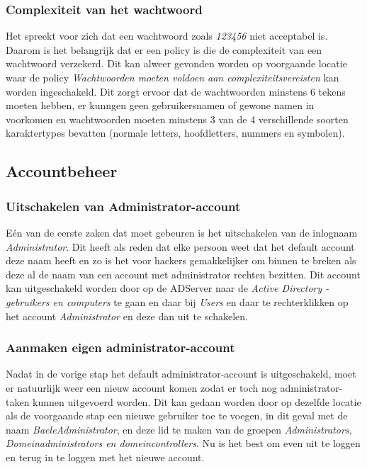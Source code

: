 \documentclass[pdftex,a4paper,12pt]{report}
\begin{document}
\subsubsection{Complexiteit van het wachtwoord}
Het spreekt voor zich dat een wachtwoord zoals \textit{123456} niet acceptabel is. Daarom is het belangrijk dat er een policy is die de complexiteit van een wachtwoord verzekerd. Dit kan alweer gevonden worden op voorgaande locatie waar de policy \textit{Wachtwoorden moeten voldoen aan complexiteitsvereisten} kan worden ingeschakeld. Dit zorgt ervoor dat de wachtwoorden minstens 6 tekens moeten hebben, er kunngen geen gebruikersnamen of gewone namen in voorkomen en wachtwoorden moeten minstens 3 van de 4 verschillende soorten karaktertypes bevatten (normale letters, hoofdletters, nummers en symbolen). \citep{Stanek2009}

\subsection{Accountbeheer}
\subsubsection{Uitschakelen van Administrator-account}
Eén van de eerste zaken dat moet gebeuren is het uitschakelen van de inlognaam \textit{Administrator}. Dit heeft als reden dat elke persoon weet dat het default account deze naam heeft en zo is het voor hackers gemakkelijker om binnen te breken als deze al de naam van een account met administrator rechten bezitten. Dit account kan uitgeschakeld worden door op de ADServer naar de \textit{Active Directory - gebruikers en computers} te gaan en daar bij \textit{Users} en daar te rechterklikken op het account \textit{Administrator} en deze dan uit te schakelen.

\subsubsection{Aanmaken eigen administrator-account}
Nadat in de vorige stap het default administrator-account is uitgeschakeld, moet er natuurlijk weer een nieuw account komen zodat er toch nog administrator-taken kunnen uitgevoerd worden. Dit kan gedaan worden door op dezelfde locatie als de voorgaande stap een nieuwe gebruiker toe te voegen, in dit geval met de naam \textit{BaeleAdministrator}, en deze lid te maken van de groepen \textit{Administrators, Domeinadministrators en domeincontrollers}. Nu is het best om even uit te loggen en terug in te loggen met het nieuwe account.
\end{document}
